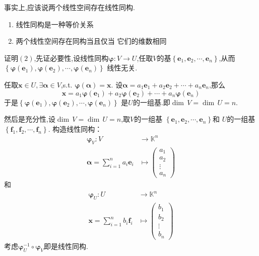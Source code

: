 \begin{green}
\begin{corollary}[线性同构的存在性]\label{cor:线性同构的存在性}
事实上,应该说两个线性空间存在线性同构.
    \begin{enumerate}[label=\textup{(\arabic*)}]
        \item 线性同构是一种等价关系
        \item 两个线性空间存在同构当且仅当
        它们的维数相同
    \end{enumerate}
\end{corollary}
\begin{Proof}
证明$(2)$,先证必要性,设线性同构$\bm{\varphi}:
V\longrightarrow U$,任取$V$的基$\left\{\bm{e}_1,
\bm{e}_2,\cdots,\bm{e}_n\right\}$,从而
$\left\{\bm{\varphi}\left(\bm{e}_1\right),
\bm{\varphi}\left(\bm{e}_2\right),\cdots,\bm{\varphi}\left(\bm{e}_n\right)\right\}$
线性无关.

任取$\bm{x}\in U,\exists \bm{\alpha}\in V$,s.t.
$\bm{\varphi}\left(\bm{\alpha}\right)=\bm{x}.$
设$\bm{\alpha}=a_1\bm{e}_1+a_2\bm{e}_2+\cdots
+a_n\bm{e}_n$,那么
\[
\bm{x}=a_1\bm{\varphi}\left(\bm{e}_1\right)+
a_2\bm{\varphi}\left(\bm{e}_2\right)+\cdots+
a_n\bm{\varphi}\left(\bm{e}_n\right)
\]
于是$\left\{\bm{\varphi}\left(\bm{e}_1\right),
\bm{\varphi}\left(\bm{e}_2\right),\cdots,\bm{\varphi}\left(\bm{e}_n\right)\right\}$
是$U$的一组基.即$\dim\,V=\dim\,U=n.$

然后是充分性,设$\dim\,V=\dim\,U=n$,取$V$的一组基
$\left\{\bm{e}_1,\bm{e}_2,\cdots,\bm{e}_n\right\}$和
$U$的一组基$\left\{\bm{f}_1,\bm{f}_2,\cdots,\bm{f}_n\right\}$.
构造线性同构：
\begin{align*}
        \bm{\varphi}_V:
        V & \longrightarrow \mathbb{K}^n\\
        \bm{\alpha} = 
        \sum_{i = 1}^{n}a_i\bm{e}_i
        & \longmapsto \begin{pmatrix}
            a_1\\
            a_2\\
            \vdots\\
            a_n
        \end{pmatrix}
    \end{align*}
和
\begin{align*}
        \bm{\varphi}_U:
        U & \longrightarrow \mathbb{K}^n\\
        \bm{x} = 
        \sum_{i = 1}^{n}b_i\bm{f}_i
        & \longmapsto \begin{pmatrix}
            b_1\\
            b_2\\
            \vdots\\
            b_n
        \end{pmatrix}
    \end{align*}
考虑$\bm{\varphi}_U^{-1}\circ \bm{\varphi}_V$即是线性同构.
\end{Proof}
\end{green}
